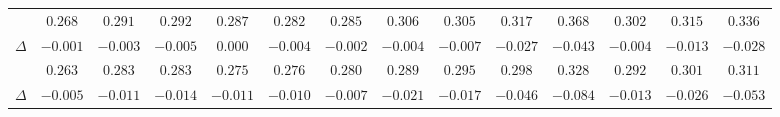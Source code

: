 \begin{table}[t]
{\begin{tabular}{@{}l*{13}{c}@{}}
\saraf{} & $0.268$ & $0.291$ & $0.292$ & $0.287$ & $0.282$ & $0.285$ & $0.306$ & $0.305$ & $0.317$ & $0.368$ & $0.302$ & $0.315$ & $0.336$ \\
\quad $\Delta$ & $-0.001$ & $-0.003$ & $-0.005$ & $0.000$ & $-0.004$ & $-0.002$ & $-0.004$ & $-0.007$ & $-0.027$ & $-0.043$ & $-0.004$ & $-0.013$ & $-0.028$ \\
\method{} & $\mathbf{0.263}$ & $\mathbf{0.283}$ & $\mathbf{0.283}$ & $\mathbf{0.275}$ & $\mathbf{0.276}$ & $\mathbf{0.280}$ & $\mathbf{0.289}$ & $\mathbf{0.295}$ & $\mathbf{0.298}$ & $\mathbf{0.328}$ & $\mathbf{0.292}$ & $\mathbf{0.301}$ & $\mathbf{0.311}$ \\
\quad $\Delta$ & $\mathbf{-0.005}$ & $\mathbf{-0.011}$ & $\mathbf{-0.014}$ & $\mathbf{-0.011}$ & $\mathbf{-0.010}$ & $\mathbf{-0.007}$ & $\mathbf{-0.021}$ & $\mathbf{-0.017}$ & $\mathbf{-0.046}$ & $\mathbf{-0.084}$ & $\mathbf{-0.013}$ & $\mathbf{-0.026}$ & $\mathbf{-0.053}$ \\
\bottomrule
\end{tabular}
}
\end{table}
